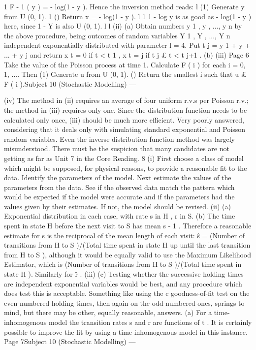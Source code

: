 \documentclass[a4paper,1pt]{article}
\begin{document}
\begin{enumerate}
1
F - 1 ( y ) = - log(1 - y ). Hence the inversion method reads:
l
(1)
Generate y from U (0, 1).
1
()
Return x = - log(1 - y ).
l
1
1
- log y is as good as - log(1 - y ) here, since 1 - Y is also U (0, 1).
l
l
(ii) (a)
Obtain numbers y 1 , y  , ..., y n by the above procedure, being outcomes
of random variables Y 1 , Y  , ..., Y n independent exponentially
distributed with parameter l = 4.
Put t j = y 1 + y  + ... + y j and return
x t = 0 if t < t 1 ,
x t = j if t j £ t < t j+1 .
(b)
(iii)
Page 6
Take the value of the Poisson process at time 1.
Calculate F ( i ) for each i = 0, 1, .... Then
(1) Generate u from U (0, 1).
() Return the smallest i such that u £ F ( i ).Subject 10 (Stochastic Modelling) — 

(iv)
The method in (ii) requires an average of four uniform r.v.s per Poisson r.v.;
the method in (iii) requires only one. Since the distribution function needs to
be calculated only once, (iii) should be much more efficient.
Very poorly answered, considering that it deals only with simulating standard
exponential and Poisson random variables. Even the inverse distribution
function method was largely misunderstood. There must be the suspicion that
many candidates are not getting as far as Unit 7 in the Core Reading.
8
(i)
First choose a class of model which might be supposed, for physical reasons, to provide a reasonable fit to the data. Identify the parameters of the model.
Next estimate the values of the parameters from the data.
See if the observed data match the pattern which would be expected if the model were accurate and if the parameters had the values given by their
estimates. If not, the model should be revised.
(ii)
(a) Exponential distribution in each case, with rate s in H , r in S.
(b) The time spent in state H before the next visit to S has mean s - 1 .
Therefore a reasonable estimate for s is the reciprocal of the mean length of each visit: ŝ = (Number of transitions from H to S )/(Total
time spent in state H up until the last transition from H to S ), although
it would be equally valid to use the Maximum Likelihood Estimator,
which is (Number of transitions from H to S )/(Total time spent in state H ).
Similarly for r̂ .
(iii)
(c) Testing whether the successive holding times are independent
exponential variables would be best, and any procedure which does test this is acceptable. Something like using the c  goodness-of-fit test
on the even-numbered holding times, then again on the odd-numbered ones, springs to mind, but there may be other, equally reasonable,
answers.
(a) For a time-inhomogenous model the transition rates s and r are functions of t .
It is certainly possible to improve the fit by using a time-inhomogenous model in this instance.
Page 7Subject 10 (Stochastic Modelling) — 


\end{enumerate}
\end{document}
